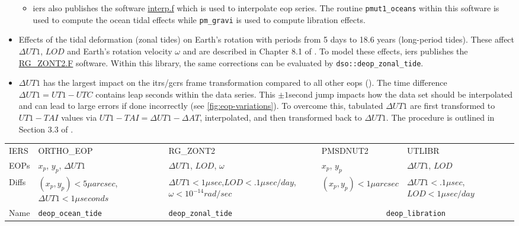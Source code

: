 \begin{itemize}
\begin{itemize}
      \item \gls{iers} also publishes the software 
       \href{https://hpiers.obspm.fr/iers/models/interp.f}{interp.f} 
        which is used to interpolate \gls{eop} series. The routine \texttt{pmut1\_oceans} 
        within this software is used to compute the ocean tidal effects while 
        \texttt{pm\_gravi} is used to compute libration effects.

    \end{itemize}

    \item Effects of the tidal deformation (zonal tides) on Earth’s rotation with 
      periods from 5 days to 18.6 years (long-period tides). These affect 
      $\Delta UT1$, $LOD$ and Earth's rotation velocity $\omega$ and are 
      described in Chapter 8.1 of \cite{iers2010}. To model these effects, \gls{iers} 
      publishes the \href{https://iers-conventions.obspm.fr/content/chapter8/software/RG_ZONT2.F}{RG\_ZONT2.F} 
      software. Within this library, the same corrections can be evaluated by \texttt{dso::deop\_zonal\_tide}.

    \item $\Delta UT1$ has the largest impact on the \gls{itrs}/\gls{gcrs} frame 
      transformation compared to all other \glspl{eop} (\cite{Bradley2016}).  The 
      time difference $\Delta UT1 = UT1-UTC$ contains leap seconds within the data 
      series. This $\pm 1$second jump impacts how the data set should be 
      interpolated and can lead to large errors if done incorrectly (see \autoref{fig:eop-variations}). 
      To overcome this, tabulated $\Delta UT1$ are first transformed to $UT1-TAI$ 
      values via $UT1 - TAI = \Delta UT1 - \Delta AT$, interpolated, and then 
      transformed back to $\Delta UT1$. The procedure is outlined in Section 3.3 of 
      \cite{Bradley2016}.

\end{itemize}

\small{
\begin{tabular}{p{1cm} p{3.3cm} p{3.3cm} p{3.3cm} p{3.3cm}}
 IERS & ORTHO\_EOP & RG\_ZONT2 & PMSDNUT2 & UTLIBR \\
 EOPs & $x_p$, $y_p$, $\Delta UT1$ & $\Delta UT1$, $LOD$, $\omega$ & $x_p$, $y_p$ & $\Delta UT1$, $LOD$ \\
 \hline
 Diffs& $(x_p, y_p) < 5\mu arcsec$,\newline $\Delta UT1 < 1\mu seconds$ & $\Delta UT1 < 1\mu sec$,\newline $LOD<.1\mu sec / day$,\newline $\omega < 10^{-14} rad/sec$ & $(x_p, y_p) < 1\mu arcsec$ & $\Delta UT1 < .1\mu sec$,\newline $LOD<1\mu sec / day$\\
 Name& \texttt{deop\_ocean\_tide} & \texttt{deop\_zonal\_tide} & \multicolumn{2}{c}{\texttt{deop\_libration}} \\
 \hline
\end{tabular}
}

